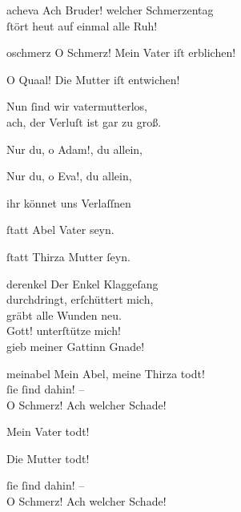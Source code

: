 \documentclass[tocstyle=ref-genre]{ees}
\begin{document}
{\begin{movement}{acheva}
  \voice[Sunam]
  Ach Bruder! welcher Schmerzentag\\
  ſtört heut auf einmal alle Ruh!
\end{movement}

\begin{movement}{oschmerz}
  \voice[Sunam]
  O Schmerz! Mein Vater iſt erblichen!

  \voice[Hamiel]
  O Quaal! Die Mutter iſt entwichen!

  \voice[beyde]
  Nun ſind wir vatermutterlos,\\
  ach, der Verluſt ist gar zu groß.

  \voice[Sunam]
  Nur du, o Adam!, du allein,

  \voice[Hamiel]
  Nur du, o Eva!, du allein,

  \voice[beyde]
  ihr könnet uns Verlaſſnen

  \voice[Sunam]
  ſtatt Abel Vater seyn.

  \voice[Hamiel]
  ſtatt Thirza Mutter ſeyn.
\end{movement}

\begin{movement}{derenkel}
  \voice[Adam]
  Der Enkel Klaggeſang\\
  durchdringt, erſchüttert mich,\\
  gräbt alle Wunden neu.\\
  Gott! unterſtütze mich!\\
  gieb meiner Gattinn Gnade!
\end{movement}

\begin{movement}{meinabel}
  \voice[Eva]
  Mein Abel, meine Thirza todt!\\
  ſie ſind dahin! –\\
  O Schmerz! Ach welcher Schade!

  \voice[Sunam]
  Mein Vater todt!

  \voice[Hamiel]
  Die Mutter todt!

  \voice[beyde]
  ſie ſind dahin! –\\
  O Schmerz! Ach welcher Schade!
\end{movement}

}
\end{document}
